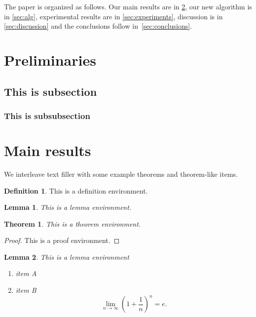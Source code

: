 \documentclass{article}
\theoremstyle{plain}
\newtheorem{theorem}{Theorem}[section]
\newtheorem{lemma}{Lemma}[section]
\theoremstyle{definition}
\newtheorem{definition}{Definition}[section]
\theoremstyle{remark}
\numberwithin{equation}{section}
\numberwithin{figure}{section}
\numberwithin{table}{section}
\begin{document}
The paper is organized as follows. Our main results are in \ref{sec:main},
our new algorithm is in \ref{sec:alg}, experimental results are in \ref{sec:experiments},
discussion is in \ref{sec:discussion} and the conclusions follow in~\ref{sec:conclusions}.


\section{Preliminaries}
\label{sec:preliminaries}

\subsection{This is subsection}

\subsubsection{This is subsubsection}


\section{Main results}
\label{sec:main}

We interleave text filler with some example theorems and theorem-like items.

\begin{definition}
This is a definition environment.
\end{definition}

\begin{lemma}
This is a lemma environment.
\end{lemma}

\begin{theorem}
This is a theorem environment.
\end{theorem}
\begin{proof}
  This is a proof environment.
\end{proof}

\begin{lemma}
This is a lemma environment
\begin{enumerate}[label=\rm (\roman*)]
  \item item A
  \item item B
  \begin{equation}\label{eq:limite}
    \lim_{n\to\infty}\left(1+\frac{1}{n}\right)^n=e.
  \end{equation}
\end{enumerate}
\end{lemma}
\end{document}

